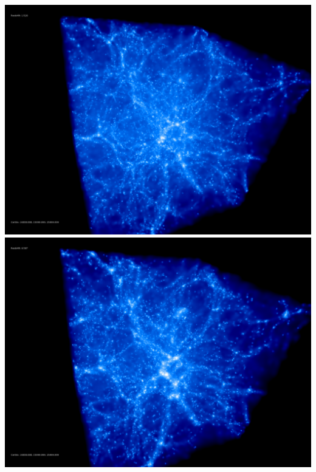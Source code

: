 \includegraphics[scale=0.1]{NGenIC_15039/50.jpg} 
\includegraphics[scale=0.1]{NGenIC_15039/100.jpg}  \\

